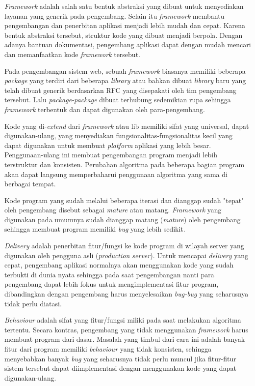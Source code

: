     \textit{Framework} adalah salah satu bentuk abstraksi yang dibuat untuk
    menyediakan layanan yang generik pada pengembang. Selain itu \textit{framework} membantu pengembangan dan penerbitan aplikasi menjadi lebih mudah dan cepat. 
    Karena bentuk abstraksi tersebut, struktur kode yang dibuat menjadi berpola. Dengan adanya bantuan dokumentasi, pengembang aplikasi dapat dengan mudah mencari dan memanfaatkan kode \textit{framework} tersebut.
    
    Pada pengembangan sistem web, sebuah \textit{framework} biasanya memiliki beberapa \textit{package} yang terdiri dari beberapa \textit{library} atau bahkan dibuat \textit{library} baru yang telah dibuat generik berdasarkan RFC yang disepakati oleh tim pengembang tersebut\cite{reactjs:rfc}. Lalu \textit{package-package} dibuat terhubung sedemikian rupa sehingga \textit{framework} terbentuk dan dapat digunakan oleh para-pengembang.
    
    Kode yang di-\textit{extend} dari \textit{framework} atau lib memiliki sifat yang universal, dapat digunakan-ulang, yang menyediakan fungsionalitas-fungsionalitas kecil yang dapat digunakan untuk membuat \textit{platform} aplikasi yang lebih besar. 
    Penggunaan-ulang ini membuat pengembangan program menjadi lebih terstruktur dan konsisten. Perubahan algoritma pada beberapa bagian program akan dapat langsung memperbaharui penggunaan algoritma yang sama di berbagai tempat.
    
    Kode program yang sudah melalui beberapa iterasi dan dianggap sudah "tepat" oleh pengembang disebut sebagai \textit{mature} atau matang. \textit{Framework} yang digunakan pada umumnya sudah dianggap matang (\textit{mature}) oleh pengembang sehingga membuat program memiliki \textit{bug} yang lebih sedikit.
    
    \textit{Delivery} adalah penerbitan fitur/fungsi ke kode program di wilayah server yang digunakan oleh pengguna asli (\textit{production server}).
    Untuk mencapai \textit{delivery} yang cepat, pengembang aplikasi normalnya akan menggunakan kode yang sudah terbukti di dunia nyata sehingga pada saat pengembangan nanti para pengembang dapat lebih fokus untuk mengimplementasi fitur program, dibandingkan dengan pengembang harus menyelesaikan \textit{bug-bug} yang seharusnya tidak perlu diatasi.
    
    \textit{Behaviour} adalah sifat yang fitur/fungsi miliki pada saat melakukan algoritma tertentu.
    Secara kontras, pengembang yang tidak menggunakan \textit{framework} harus membuat program dari dasar. 
    Masalah yang timbul dari cara ini adalah banyak fitur dari program memiliki \textit{behaviour} yang tidak konsisten, sehingga menyebabkan banyak \textit{bug} yang seharusnya tidak perlu muncul jika fitur-fitur sistem tersebut dapat diimplementasi dengan menggunakan kode yang dapat digunakan-ulang.
    

